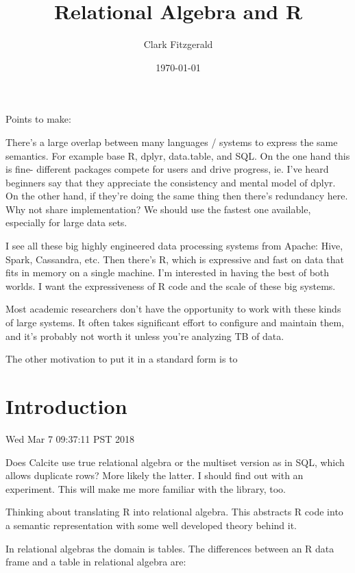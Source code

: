 \documentclass[12pt]{article}
\begin{document}
\title{Relational Algebra and R}
\date{\today}
\author{Clark Fitzgerald}
\maketitle

Points to make:

There's a large overlap between many languages / systems to express the
same semantics. For example base R, dplyr, data.table, and SQL.
On the one hand this is fine- different packages compete for users and
drive progress, ie. I've heard beginners say that they appreciate the
consistency and mental model of dplyr.  On the other hand, if they're doing
the same thing then there's redundancy here.  Why not share implementation?
We should use the fastest one available, especially for large data sets.

I see all these big highly engineered data processing systems
from Apache: Hive, Spark, Cassandra, etc. Then there's R, which is
expressive and fast on data that fits in memory on a single machine.
I'm interested in having the best of both worlds. I want the expressiveness
of R code and the scale of these big systems.

Most academic researchers don't have the opportunity to work with
these kinds of large systems. It often takes significant effort to
configure and maintain them, and it's probably not worth it unless you're
analyzing TB of data.

The other motivation to put it in a standard form is to 

\section{Introduction}

Wed Mar  7 09:37:11 PST 2018

Does Calcite use true relational algebra or the multiset version as in SQL,
which allows duplicate rows? More likely the latter. I should find out
with an experiment. This will make me more familiar with the library, too.



Thinking about translating R into relational algebra.
This abstracts R code into a semantic representation with some well
developed theory behind it.

In relational algebras the domain is tables. The differences between an R
data frame and a table in relational algebra are:
\end{document}
